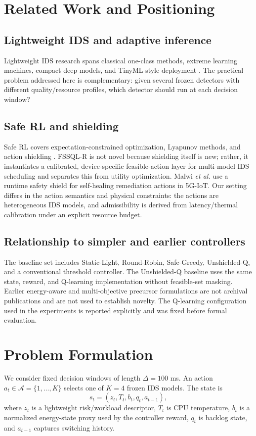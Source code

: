 \documentclass[journal]{IEEEtran}
\newcommand{\Aset}{\mathcal{A}}
\begin{document}
\section{Related Work and Positioning}
\subsection{Lightweight IDS and adaptive inference}
Lightweight IDS research spans classical one-class methods, extreme learning machines, compact deep models, and TinyML-style deployment \cite{tax2004svdd,huang2006elm,doriguzzi2020lucid,fusco2024tinyids,warden2019tinyml,lin2020mcunet}. The practical problem addressed here is complementary: given several frozen detectors with different quality/resource profiles, which detector should run at each decision window?

\subsection{Safe RL and shielding}
Safe RL covers expectation-constrained optimization, Lyapunov methods, and action shielding \cite{garcia2015safesurvey,achiam2017cpo,chow2018lyapunov,alshiekh2018shielding}. FSSQL-R is not novel because shielding itself is new; rather, it instantiates a calibrated, device-specific feasible-action layer for multi-model IDS scheduling and separates this from utility optimization. Malwi \emph{et al.} \cite{malwi2026safetyaware} use a runtime safety shield for self-healing remediation actions in 5G-IoT. Our setting differs in the action semantics and physical constraints: the actions are heterogeneous IDS models, and admissibility is derived from latency/thermal calibration under an explicit resource budget.

\subsection{Relationship to simpler and earlier controllers}
The baseline set includes Static-Light, Round-Robin, Safe-Greedy, Unshielded-Q, and a conventional threshold controller. The Unshielded-Q baseline uses the same state, reward, and Q-learning implementation without feasible-set masking. Earlier energy-aware and multi-objective precursor formulations are not archival publications and are not used to establish novelty. The Q-learning configuration used in the experiments is reported explicitly and was fixed before formal evaluation.

\section{Problem Formulation}
We consider fixed decision windows of length $\Delta=100$ ms. An action $a_t\in\Aset=\{1,\ldots,K\}$ selects one of $K=4$ frozen IDS models. The state is
\begin{equation}
s_t=(z_t,T_t,b_t,q_t,a_{t-1}),
\label{eq:state}
\end{equation}
where $z_t$ is a lightweight risk/workload descriptor, $T_t$ is CPU temperature, $b_t$ is a normalized energy-state proxy used by the controller reward, $q_t$ is backlog state, and $a_{t-1}$ captures switching history.
\end{document}
